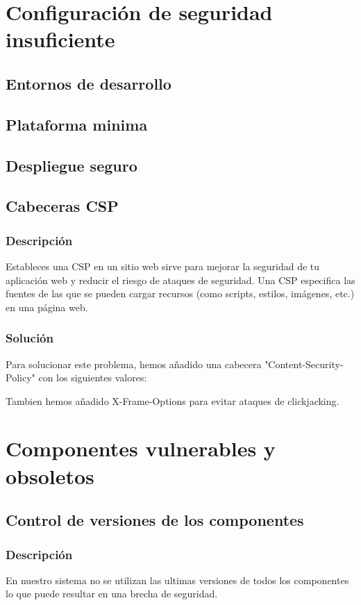 \documentclass{report}
\begin{document}
        \section{Configuración de seguridad insuficiente}
            \subsection{Entornos de desarrollo}
            \subsection{Plataforma minima}
            \subsection{Despliegue seguro}
            \subsection{Cabeceras CSP}
                \subsubsection{Descripción}
                    Estableces una CSP en un sitio web sirve para mejorar la seguridad de tu aplicación web y reducir el riesgo de ataques de seguridad. 
                    Una CSP especifica las fuentes de las que se pueden cargar recursos (como scripts, estilos, imágenes, etc.) en una página web.
                \subsubsection{Solución}
                    Para solucionar este problema, hemos añadido una cabecera "Content-Security-Policy" con los siguientes valores:
                    
                    Tambien hemos añadido X-Frame-Options para evitar ataques de clickjacking.
        \clearpage
        \section{Componentes vulnerables y obsoletos}
            \subsection{Control de versiones de los componentes}
                \subsubsection{Descripción}
                    En nuestro sistema no se utilizan las ultimas versiones de todos los componentes lo que puede resultar en una brecha de seguridad.
\end{document}
